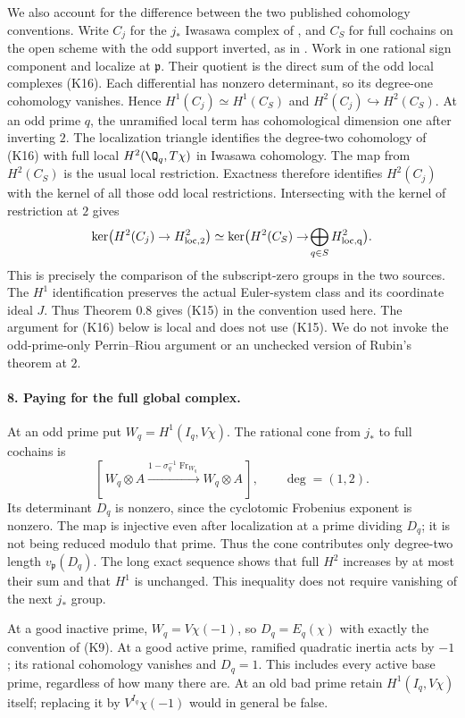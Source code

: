 We also account for the difference between the two published
cohomology conventions. Write $C_j$ for the $j_*$ Iwasawa complex of
\cite[Section 12.1]{kato}, and $C_S$ for full cochains on the open
scheme with the odd support inverted, as in \cite[Section 0.5]{kato1999}.
Work in one rational sign component and localize at $\mathfrak p$.
Their quotient is the direct sum of the odd local complexes (K16).
Each differential has nonzero determinant, so its degree-one
cohomology vanishes. Hence $H^1(C_j)\simeq H^1(C_S)$ and
$H^2(C_j)\hookrightarrow H^2(C_S)$. At an odd prime $q$, the
unramified local term has cohomological dimension one after inverting
$2$. The localization triangle identifies the degree-two cohomology
of (K16) with full local $H^2(\Q_q,T\chi)$ in Iwasawa cohomology.
The map from $H^2(C_S)$ is the usual local restriction. Exactness
therefore identifies $H^2(C_j)$ with the kernel of all those odd
local restrictions. Intersecting with the kernel of restriction at
$2$ gives
\[
 \ker\bigl(H^2(C_j)\to H^2_{\rm loc,2}\bigr)
 \simeq
 \ker\bigl(H^2(C_S)\to\!\bigoplus_{q\in S}H^2_{\rm loc,q}\bigr).
\]
This is precisely the comparison of the subscript-zero groups in
the two sources. The $H^1$ identification preserves the actual
Euler-system class and its coordinate ideal $J$. Thus Theorem 0.8
gives (K15) in the convention used here. The argument for (K16)
below is local and does not use (K15). We do not invoke the
odd-prime-only Perrin--Riou argument or an unchecked version of
Rubin's theorem at $2$.

\paragraph{8. Paying for the full global complex.}
At an odd prime put $W_q=H^1(I_q,V\chi)$. The rational cone from
$j_*$ to full cochains is
\[
 [\,W_q\otimes A\xrightarrow{1-\sigma_q^{-1}\operatorname{Fr}_{W_q}}
          W_q\otimes A\,],\qquad\deg=(1,2).              \tag{K16}
\]
Its determinant $D_q$ is nonzero, since the cyclotomic Frobenius
exponent is nonzero. The map is injective even after localization
at a prime dividing $D_q$; it is not being reduced modulo that
prime. Thus the cone contributes only degree-two length
$v_{\mathfrak p}(D_q)$. The long exact sequence shows that full
$H^2$ increases by at most their sum and that $H^1$ is unchanged.
This inequality does not require vanishing of the next $j_*$ group.

At a good inactive prime, $W_q=V\chi(-1)$, so $D_q=E_q(\chi)$
with exactly the convention of (K9). At a good active prime,
ramified quadratic inertia acts by $-1$; its rational cohomology
vanishes and $D_q=1$. This includes every active base prime,
regardless of how many there are. At an old bad prime retain
$H^1(I_q,V\chi)$ itself; replacing it by $V^{I_q}\chi(-1)$
would in general be false.

